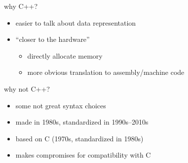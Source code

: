 \begin{frame}{why C++?}
    \begin{itemize}
    \item easier to talk about data representation
    \item ``closer to the hardware''
        \begin{itemize}
        \item directly allocate memory
        \item more obvious translation to assembly/machine code
        \end{itemize}
    \end{itemize}
\end{frame}

\begin{frame}{why not C++?}
    \begin{itemize}
    \item some not great syntax choices
    \item made in 1980s, standardized in 1990s--2010s
    \item based on C (1970s, standardized in 1980s)
    \item makes compromises for compatibility with C
    \end{itemize}
\end{frame}


